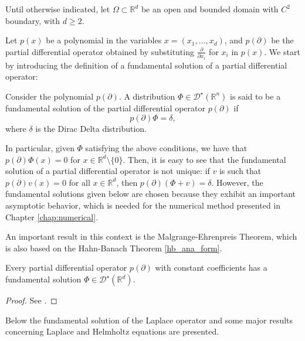 \label{chap:problem_introduction}

Until otherwise indicated, let \(\Omega \subset \mathbb{R}^d\) be an open and bounded domain with \(C^2\) boundary, with $d \geq 2$.

Let \(p(x)\) be a polynomial in the variables \(x=(x_1,\dots,x_d)\), and \(p(\partial)\) be the partial differential operator obtained by substituting \(\frac{\partial}{\partial x_i}\) for \(x_i\) in \(p(x)\). We start by introducing the definition of a fundamental solution of a partial differential operator:

\begin{definition}
    Consider the polynomial \(p(\partial)\). A distribution \(\Phi \in \mathcal{D}^\star(\mathbb{R}^n)\) is said to be a fundamental solution of the partial differential operator \(p(\partial)\) if
    \[
        p(\partial) \Phi = \delta,
    \]
    where \(\delta\) is the Dirac Delta distribution.
\end{definition}

In particular, given \(\Phi\) satisfying the above conditions, we have that \(p(\partial)\Phi(x) = 0\) for \(x \in \mathbb{R}^d\setminus \{0\}\). Then, it is easy to see that the fundamental solution of a partial differential operator is not unique: if \(v\) is such that \(p(\partial) v(x) = 0\) for all \(x \in \mathbb{R}^d\), then \(p(\partial) (\Phi + v) = \delta\). However, the fundamental solutions given below are chosen because they exhibit an important asymptotic behavior, which is needed for the numerical method presented in Chapter \ref{chap:numerical}.

An important result in this context is the Malgrange-Ehrenpreis Theorem, which is also based on the Hahn-Banach Theorem \ref{hb_ana_form}.

\begin{theorem}\label{malgrange-ehrenpreis}
    Every partial differential operator $p(\partial)$ with constant coefficients has a fundamental solution $\Phi \in \mathcal{D}^\star(\mathbb{R}^d)$.
\end{theorem}
\begin{proof}
    See \cite{reed1975ii}.
\end{proof}
Below the fundamental solution of the Laplace operator and some major results concerning Laplace and Helmholtz equations are presented. 

